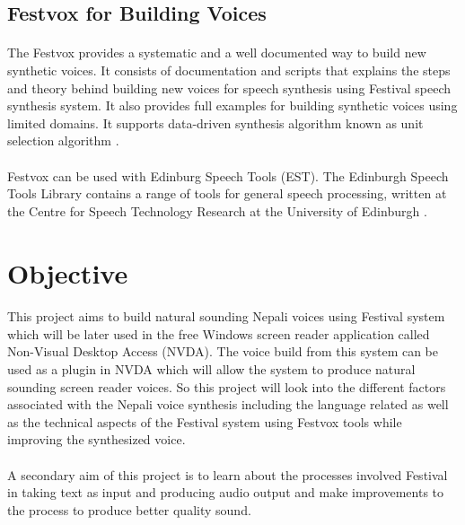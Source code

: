 \documentclass{article}
\begin{document}
		\subsection{Festvox for Building Voices}
		\paragraph{}
			The Festvox provides a systematic and a well documented way to build new synthetic voices. It consists of documentation and scripts that explains the steps and theory behind building new voices for speech synthesis using Festival speech synthesis system. It also provides full examples for building synthetic voices using limited domains. It supports data-driven synthesis algorithm known as unit selection algorithm  \cite{UNITSEL:4}. 
		\paragraph{}
	Festvox can be used with Edinburg Speech Tools (EST). The Edinburgh Speech Tools Library contains a range of tools for general speech processing, written at the Centre for Speech Technology Research at the University of Edinburgh \cite{FESTVOX:3}.

	\section{Objective}
		\paragraph{}
			This project aims to build natural sounding Nepali voices using Festival system which will be later used in the free Windows screen reader application called Non-Visual Desktop Access (NVDA). The voice build from this system can be used as a plugin in NVDA which will allow the system to produce natural sounding screen reader voices. So this project will look into the different factors associated with the Nepali voice synthesis including the language related as well as the technical aspects of the Festival system using Festvox tools while improving the synthesized voice.
		\paragraph{}
			A secondary aim of this project is to learn about the processes involved Festival in taking text as input and producing audio output and make improvements to the process to produce better quality sound.
\end{document}
